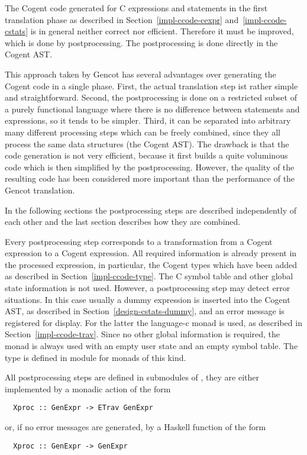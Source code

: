 The Cogent code generated for C expressions and statements in the first translation phase as described in 
Section~\ref{impl-ccode-cexpr} and~\ref{impl-ccode-cstats} is in general neither correct nor efficient.
Therefore it must be improved, which is done by postprocessing. The postprocessing is done directly in the Cogent AST.

This approach taken by Gencot has several advantages over generating the Cogent code in a single phase.
First, the actual translation step ist rather simple and straightforward. Second, the postprocessing
is done on a restricted subset of a purely functional language where
there is no difference between statements and expressions, so it tends to be simpler. Third, it can be separated
into arbitrary many different processing steps which can be freely combined, since they all process the same
data structures (the Cogent AST). The drawback is that the code generation is not very efficient, because it
first builds a quite voluminous code which is then simplified by the postprocessing. However, the quality 
of the resulting code has been considered more important than the performance of the Gencot translation.

In the following sections the postprocessing steps are described independently of each other and the last
section describes how they are combined.

Every postprocessing step corresponds to a transformation from a Cogent expression to a Cogent expression.
All required information is already present in the processed expression, in particular, the Cogent types
which have been added as described in Section~\ref{impl-ccode-type}. The C symbol table and other global state
information is not used. However, a postprocessing step may detect error situations. In this case usually a
dummy expression is inserted into the Cogent AST, as described in Section~\ref{design-cstats-dummy}, and an
error message is registered for display. For the latter the language-c  monad is used, as described
in Section~\ref{impl-ccode-trav}. Since no other global information is required, the monad is always used
with an empty user state and an empty symbol table. The type  is defined in module
 for monads of this kind.

All postprocessing steps are defined in submodules of , they are either implemented
by a monadic action of the form
\begin{verbatim}
  Xproc :: GenExpr -> ETrav GenExpr
\end{verbatim}
or, if no error messages are generated, by a Haskell function of the form
\begin{verbatim}
  Xproc :: GenExpr -> GenExpr
\end{verbatim}

